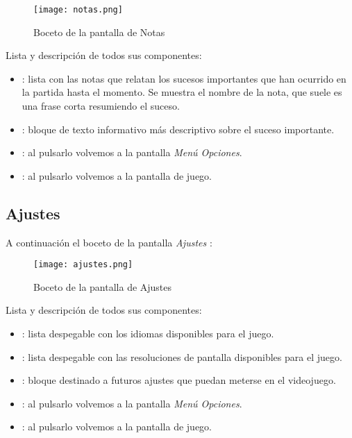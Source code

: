             \begin{figure}[H] 
            	\begin{center}
            		\texttt{[image: notas.png]}
            	\end{center}
            	\caption{Boceto de la pantalla de Notas}
            	\label{fig:notas}
            \end{figure}
            
            Lista y descripción de todos sus componentes:
            \begin{itemize}
            	\item {}: lista con las notas que relatan los sucesos importantes que han ocurrido en la partida hasta el momento. Se muestra el nombre de la nota, que suele es una frase corta resumiendo el suceso.
            	\item {}: bloque de texto informativo más descriptivo sobre el suceso importante.
            	\item {}: al pulsarlo volvemos a la pantalla \emph{Menú Opciones}.
            	\item {}: al pulsarlo volvemos a la pantalla de juego.
            \end{itemize}
            
            \newpage
            \subsection{Ajustes}
            A continuación el boceto de la pantalla \emph{Ajustes} :
            
            \begin{figure}[H] 
            	\begin{center}
            		\texttt{[image: ajustes.png]}
            	\end{center}
            	\caption{Boceto de la pantalla de Ajustes}
            	\label{fig:ajustes}
            \end{figure}
            
            Lista y descripción de todos sus componentes:
            \begin{itemize}
            	\item {}: lista despegable con los idiomas disponibles para el juego.
            	\item {}: lista despegable con las resoluciones de pantalla disponibles para el juego.
            	\item {}: bloque destinado a futuros ajustes que puedan meterse en el videojuego.
            	\item {}: al pulsarlo volvemos a la pantalla \emph{Menú Opciones}.
            	\item {}: al pulsarlo volvemos a la pantalla de juego.
            \end{itemize}
            
